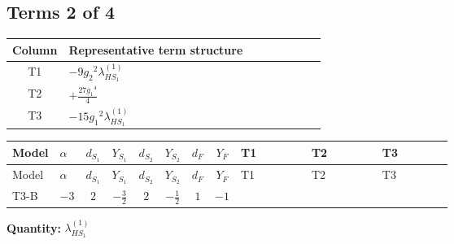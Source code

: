 \documentclass[8pt]{article}
\begin{document}
\begin{landscape}
\subsection*{Terms 2 of 4}
\begin{center}
\begin{tabular}{@{}c >{\raggedright\arraybackslash}p{0.82\linewidth}@{}}
\toprule
Column & Representative term structure \\
\midrule
T1 & \(\displaystyle -9 {g_2}^2 {\lambda_{HS_1}^{(1)}}\) \\
\midrule
T2 & \(\displaystyle +\frac{27 {g_1}^4}{4}\) \\
\midrule
T3 & \(\displaystyle -15 {g_1}^2 {\lambda_{HS_1}^{(1)}}\) \\
\midrule
\bottomrule
\end{tabular}
\end{center}
\smallskip
\tiny
\begin{longtable}{@{}llcccccc >{\raggedright\arraybackslash}p{0.21\linewidth} >{\raggedright\arraybackslash}p{0.21\linewidth} >{\raggedright\arraybackslash}p{0.21\linewidth}@{}}
\toprule
Model & $\alpha$ & $d_{S_1}$ & $Y_{S_1}$ & $d_{S_2}$ & $Y_{S_2}$ & $d_F$ & $Y_F$ & T1 & T2 & T3 \\
\midrule
\endfirsthead
\toprule
Model & $\alpha$ & $d_{S_1}$ & $Y_{S_1}$ & $d_{S_2}$ & $Y_{S_2}$ & $d_F$ & $Y_F$ & T1 & T2 & T3 \\
\midrule
\endhead
T3-B & $-3$ & $2$ & $-\frac{3}{2}$ & $2$ & $-\frac{1}{2}$ & $1$ & $-1$ & \scriptsize\adjustbox{max width=\linewidth}{$\begin{gathered} -9 {g_2}^2 {\lambda_{HS_1}^{(1)}}\end{gathered}$} & \scriptsize\adjustbox{max width=\linewidth}{$\begin{gathered} +\frac{27 {g_1}^4}{4}\end{gathered}$} & \scriptsize\adjustbox{max width=\linewidth}{$\begin{gathered} -15 {g_1}^2 {\lambda_{HS_1}^{(1)}}\end{gathered}$} \\
\midrule
\bottomrule
\end{longtable}
\clearpage
\noindent\textbf{Quantity: }$\lambda_{HS_1}^{(1)}$\par\smallskip

\end{landscape}
\end{document}
